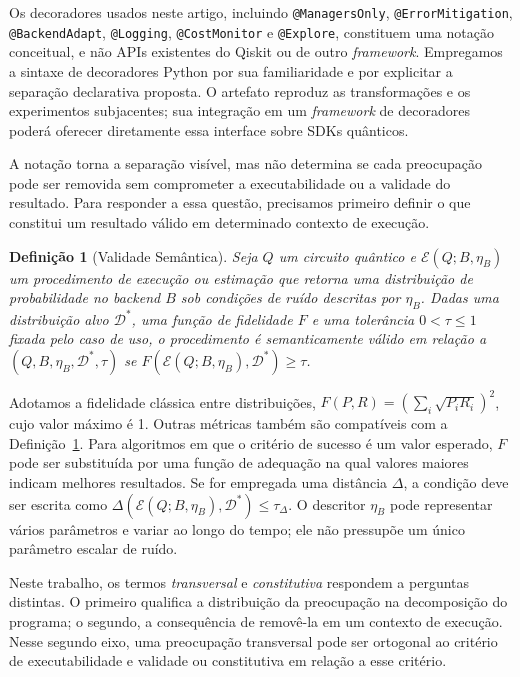 \documentclass[sigconf]{acmart}
\newtheorem{definition}{Definição}
\begin{document}
Os decoradores usados neste artigo, incluindo \texttt{@ManagersOnly}, \texttt{@ErrorMitigation}, \texttt{@BackendAdapt}, \texttt{@Logging}, \texttt{@CostMonitor} e \texttt{@Explore}, constituem uma notação conceitual, e não APIs existentes do Qiskit ou de outro \textit{framework}. Empregamos a sintaxe de decoradores Python por sua familiaridade e por explicitar a separação declarativa proposta. O artefato reproduz as transformações e os experimentos subjacentes; sua integração em um \textit{framework} de decoradores poderá oferecer diretamente essa interface sobre SDKs quânticos.

A notação torna a separação visível, mas não determina se cada preocupação pode ser removida sem comprometer a executabilidade ou a validade do resultado. Para responder a essa questão, precisamos primeiro definir o que constitui um resultado válido em determinado contexto de execução.

\begin{definition}[Validade Semântica]
\label{def:semantic-validity}
Seja $Q$ um circuito quântico e $\mathcal{E}(Q;B,\eta_B)$ um procedimento de execução ou estimação que retorna uma distribuição de probabilidade no \textit{backend} $B$ sob condições de ruído descritas por $\eta_B$. Dadas uma distribuição alvo $\mathcal{D}^*$, uma função de fidelidade $F$ e uma tolerância $0<\tau\leq1$ fixada pelo caso de uso, o procedimento é semanticamente válido em relação a $(Q,B,\eta_B,\mathcal{D}^*,\tau)$ se $F(\mathcal{E}(Q;B,\eta_B),\mathcal{D}^*)\geq\tau$.
\end{definition}

Adotamos a fidelidade clássica entre distribuições, $F(P,R)=(\sum_i\sqrt{P_iR_i})^2$, cujo valor máximo é 1. Outras métricas também são compatíveis com a Definição~\ref{def:semantic-validity}. Para algoritmos em que o critério de sucesso é um valor esperado, $F$ pode ser substituída por uma função de adequação na qual valores maiores indicam melhores resultados. Se for empregada uma distância $\Delta$, a condição deve ser escrita como $\Delta(\mathcal{E}(Q;B,\eta_B),\mathcal{D}^*)\leq\tau_\Delta$. O descritor $\eta_B$ pode representar vários parâmetros e variar ao longo do tempo; ele não pressupõe um único parâmetro escalar de ruído.

Neste trabalho, os termos \emph{transversal} e \emph{constitutiva} respondem a perguntas distintas. O primeiro qualifica a distribuição da preocupação na decomposição do programa; o segundo, a consequência de removê-la em um contexto de execução. Nesse segundo eixo, uma preocupação transversal pode ser ortogonal ao critério de executabilidade e validade ou constitutiva em relação a esse critério.
\end{document}
